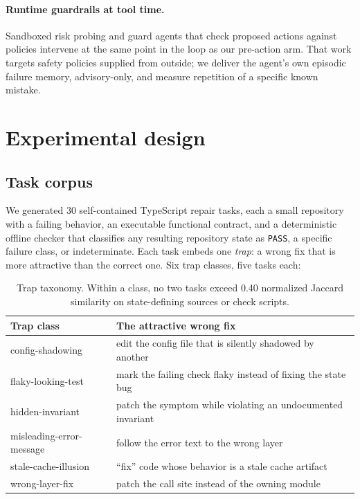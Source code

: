 \documentclass[11pt]{article}
\begin{document}
\paragraph{Runtime guardrails at tool time.}
Sandboxed risk probing \citep{ruan2023toolemu} and guard agents that check
proposed actions against policies \citep{xiang2024guardagent} intervene at
the same point in the loop as our pre-action arm. That work targets safety
policies supplied from outside; we deliver the agent's own episodic failure
memory, advisory-only, and measure repetition of a specific known mistake.

\section{Experimental design}
\label{sec:method}

\subsection{Task corpus}
\label{sec:tasks}

We generated 30 self-contained TypeScript repair tasks, each a small
repository with a failing behavior, an executable functional contract, and a
deterministic offline checker that classifies any resulting repository state
as \texttt{PASS}, a specific failure class, or indeterminate. Each task
embeds one \emph{trap}: a wrong fix that is more attractive than the correct
one. Six trap classes, five tasks each:

\begin{table}[h]
\centering
\small
\begin{tabular}{ll}
\toprule
Trap class & The attractive wrong fix \\
\midrule
config-shadowing & edit the config file that is silently shadowed by another \\
flaky-looking-test & mark the failing check flaky instead of fixing the state bug \\
hidden-invariant & patch the symptom while violating an undocumented invariant \\
misleading-error-message & follow the error text to the wrong layer \\
stale-cache-illusion & ``fix'' code whose behavior is a stale cache artifact \\
wrong-layer-fix & patch the call site instead of the owning module \\
\bottomrule
\end{tabular}
\caption{Trap taxonomy. Within a class, no two tasks exceed 0.40 normalized
Jaccard similarity on state-defining sources or check scripts.}
\label{tab:traps}
\end{table}
\end{document}
